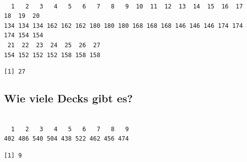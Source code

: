 \documentclass[
  letterpaper,
  DIV=11,
  numbers=noendperiod]{scrartcl}
\newenvironment{Shaded}{\begin{snugshade}}{\end{snugshade}}
\newcommand{\FunctionTok}[1]{\textcolor[rgb]{0.28,0.35,0.67}{#1}}
\newcommand{\NormalTok}[1]{\textcolor[rgb]{0.00,0.23,0.31}{#1}}
\newcommand{\SpecialCharTok}[1]{\textcolor[rgb]{0.37,0.37,0.37}{#1}}
\begin{document}
\begin{Shaded}
\end{Shaded}

\begin{verbatim}

  1   2   3   4   5   6   7   8   9  10  11  12  13  14  15  16  17  18  19  20 
134 134 134 162 162 162 180 180 180 168 168 168 146 146 146 174 174 174 154 154 
 21  22  23  24  25  26  27 
154 152 152 152 158 158 158 
\end{verbatim}

\begin{Shaded}
\end{Shaded}

\begin{verbatim}
[1] 27
\end{verbatim}

\subsection{Wie viele Decks gibt es?}\label{wie-viele-decks-gibt-es}

\begin{Shaded}
\end{Shaded}

\begin{verbatim}

  1   2   3   4   5   6   7   8   9 
402 486 540 504 438 522 462 456 474 
\end{verbatim}

\begin{Shaded}
\end{Shaded}

\begin{verbatim}
[1] 9
\end{verbatim}
\end{document}
